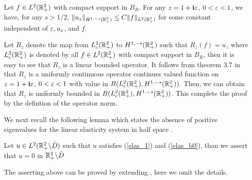 \documentclass[11pt]{iopart}
\begin{document}
\begin{lem}{\label{global_es}}
	Let  $ f  \in L^2 (\mathbb{R}^2_+) $ with compact support in $B_R$. For any $z=1+\mathbf{i}\varepsilon$, $0<\varepsilon<1$, we have, for any $s>1/2$,
	$\|u_z\|_{H^{1,-s}(\mathbb{R}^2_+)}\le C\|f\|_{L^2(\mathbb{R}^2_+)}$ for some constant independent of $\varepsilon, u_z$, and $f$.
\end{lem}
\debproof
Let $R_z$ denote the map from $L^2_c(\mathbb{R}^2_+)$ to $H^{1,-s}(\mathbb{R}^2_+)$ such that $R_z(f)=u_z$ where $L^2_c(\mathbb{R}^2_+)$ is denoted by all $ f  \in L^2 (\mathbb{R}^2_+) $ with compact support in $B_R$, then it is easy to see that $R_z$ is a linear bounded operator. It follows from theorem 3.7 in \cite{Yves1988} that $R_z$ is a uniformly continuous operator continues valued function on $z=1+\mathbf{i}\varepsilon$, $0<\varepsilon<1$ with value in $B(L^2_c(\mathbb{R}^2_+),H^{1,-s}(\mathbb{R}^2_+))$. Then, we can obtain that $R_z$ is uniformly bounded in $B(L^2_c(\mathbb{R}^2_+),H^{1,-s}(\mathbb{R}^2_+))$. This complete the proof by the defintion of the operator norm.
\finproof

We next recall the following lemma which states the absence of positive eigenvalues for the linear elasticity system in half space \cite{sini2004}.
\begin{lem} \label{elas_unique}
	Let $u\in L^2(\mathbb{R}^2_+ \backslash \bar D)$ such that $u$ satisfies (\ref{elas_1}) and (\ref{elas_b0}), than we assert that $u=0$ in $\mathbb{R}^2_+ \backslash \bar D$
\end{lem}
\debproof
The asserting above can be proved by extending \cite[theorem 3.1]{sini2004}, here we omit the details.
\finproof
\end{document}
